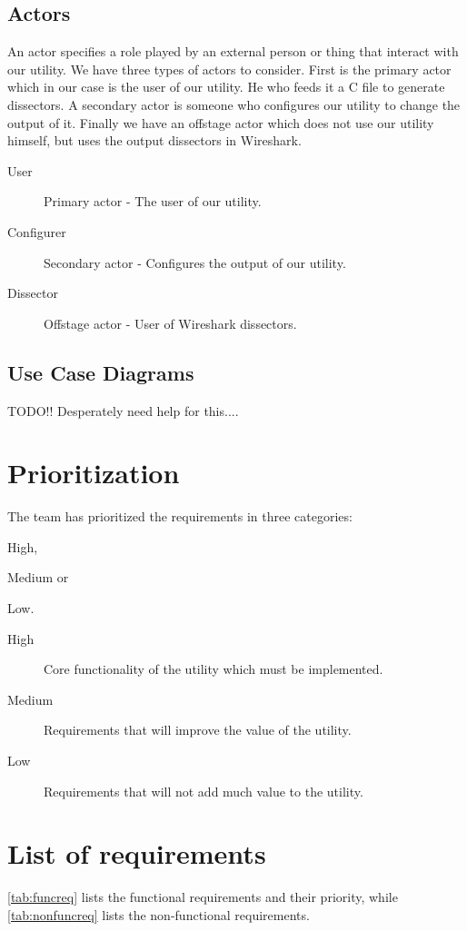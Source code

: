 \subsection{Actors}
An actor specifies a role played by an external person or thing that interact
with our utility. We have three types of actors to consider. First is the
primary actor which in our case is the user of our utility. He who feeds it a
C file to generate dissectors. A secondary actor is someone who configures our
utility to change the output of it. Finally we have an offstage actor which
does not use our utility himself, but uses the output dissectors in Wireshark.

\begin{description}
	\item[User] Primary actor - The user of our utility.
	\item[Configurer] Secondary actor - Configures the output of our utility.
	\item[Dissector] Offstage actor - User of Wireshark dissectors.
\end{description}

\subsection{Use Case Diagrams}
TODO!! Desperately need help for this....

\section{Prioritization}
\label{sec:reqspriority}
The team has prioritized the requirements in three categories:
\begin{inparaenum}
	\item High,
	\item Medium or
	\item Low.
\end{inparaenum} 

\begin{description}
	\item[High] Core functionality of the utility which must be implemented.
	\item[Medium] Requirements that will improve the value of the utility.
	\item[Low] Requirements that will not add much value to the utility.
\end{description}

\section{List of requirements}
\label{sec:reqslist}
\autoref{tab:funcreq} lists the functional requirements and their priority,
while \autoref{tab:nonfuncreq} lists the non-functional requirements.

